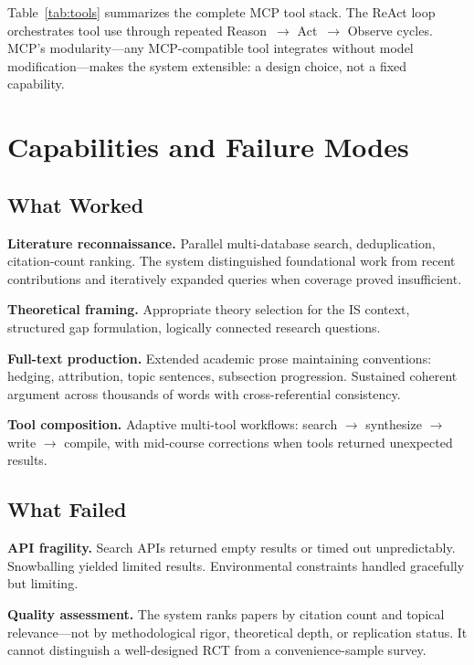 \documentclass{article}
\begin{document}
Table~\ref{tab:tools} summarizes the complete MCP tool stack. The ReAct loop \citep{yao2022react} orchestrates tool use through repeated Reason~$\rightarrow$ Act~$\rightarrow$ Observe cycles. MCP's modularity---any MCP-compatible tool integrates without model modification---makes the system extensible: a design choice, not a fixed capability.

\section{Capabilities and Failure Modes}
\label{sec:capabilities}

\subsection{What Worked}

\textbf{Literature reconnaissance.} Parallel multi-database search, deduplication, citation-count ranking. The system distinguished foundational work from recent contributions and iteratively expanded queries when coverage proved insufficient.

\textbf{Theoretical framing.} Appropriate theory selection for the IS context, structured gap formulation, logically connected research questions.

\textbf{Full-text production.} Extended academic prose maintaining conventions: hedging, attribution, topic sentences, subsection progression. Sustained coherent argument across thousands of words with cross-referential consistency.

\textbf{Tool composition.} Adaptive multi-tool workflows: search $\rightarrow$ synthesize $\rightarrow$ write $\rightarrow$ compile, with mid-course corrections when tools returned unexpected results.

\subsection{What Failed}

\textbf{API fragility.} Search APIs returned empty results or timed out unpredictably. Snowballing yielded limited results. Environmental constraints handled gracefully but limiting.

\textbf{Quality assessment.} The system ranks papers by citation count and topical relevance---not by methodological rigor, theoretical depth, or replication status. It cannot distinguish a well-designed RCT from a convenience-sample survey.
\end{document}

